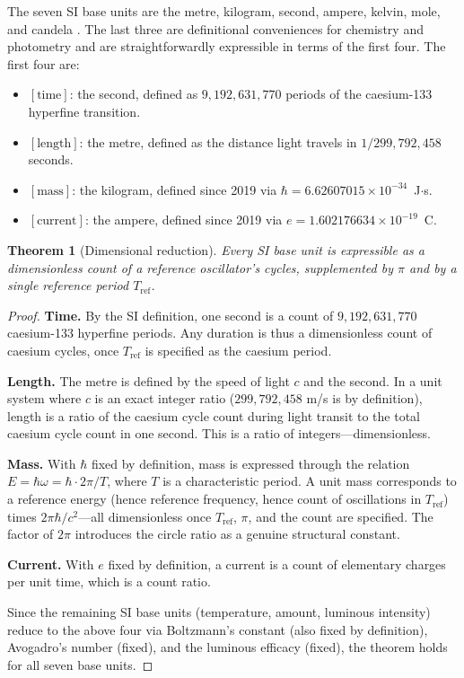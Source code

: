 \documentclass[11pt,twocolumn,a4paper]{article}
\newtheorem{theorem}{Theorem}[section]
\theoremstyle{definition}
\theoremstyle{remark}
\begin{document}
The seven SI base units are the metre, kilogram, second, ampere, kelvin, mole, and candela \citep{codata2018}. The last three are definitional conveniences for chemistry and photometry and are straightforwardly expressible in terms of the first four. The first four are:
\begin{itemize}[nosep]
\item $[\text{time}]$: the second, defined as $9{,}192{,}631{,}770$ periods of the caesium-133 hyperfine transition.
\item $[\text{length}]$: the metre, defined as the distance light travels in $1/299{,}792{,}458$ seconds.
\item $[\text{mass}]$: the kilogram, defined since 2019 via $\hbar = 6.62607015 \times 10^{-34}$~J$\cdot$s.
\item $[\text{current}]$: the ampere, defined since 2019 via $e = 1.602176634 \times 10^{-19}$~C.
\end{itemize}

\begin{theorem}[Dimensional reduction]\label{thm:reduction}
Every SI base unit is expressible as a dimensionless count of a reference oscillator's cycles, supplemented by $\pi$ and by a single reference period $T_\text{ref}$.
\end{theorem}

\begin{proof}
\textbf{Time.} By the SI definition, one second is a count of $9{,}192{,}631{,}770$ caesium-133 hyperfine periods. Any duration is thus a dimensionless count of caesium cycles, once $T_\text{ref}$ is specified as the caesium period.

\textbf{Length.} The metre is defined by the speed of light $c$ and the second. In a unit system where $c$ is an exact integer ratio ($299{,}792{,}458$ m/s is by definition), length is a ratio of the caesium cycle count during light transit to the total caesium cycle count in one second. This is a ratio of integers---dimensionless.

\textbf{Mass.} With $\hbar$ fixed by definition, mass is expressed through the relation $E = \hbar\omega = \hbar \cdot 2\pi/T$, where $T$ is a characteristic period. A unit mass corresponds to a reference energy (hence reference frequency, hence count of oscillations in $T_\text{ref}$) times $2\pi\hbar/c^2$---all dimensionless once $T_\text{ref}$, $\pi$, and the count are specified. The factor of $2\pi$ introduces the circle ratio as a genuine structural constant.

\textbf{Current.} With $e$ fixed by definition, a current is a count of elementary charges per unit time, which is a count ratio.

Since the remaining SI base units (temperature, amount, luminous intensity) reduce to the above four via Boltzmann's constant (also fixed by definition), Avogadro's number (fixed), and the luminous efficacy (fixed), the theorem holds for all seven base units.
\end{proof}
\end{document}

